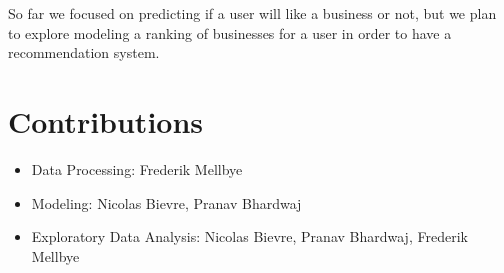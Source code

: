 \documentclass[letterpaper, 11pt]{article}
\begin{document}
So far we focused on predicting if a user will like a business or not, but we plan to explore modeling a ranking of businesses for a user in order to have a recommendation system.



\section{Contributions}

\begin{itemize}
    \item Data Processing: Frederik Mellbye
    \item Modeling: Nicolas Bievre, Pranav Bhardwaj
    \item Exploratory Data Analysis: Nicolas Bievre, Pranav Bhardwaj, Frederik Mellbye
\end{itemize}
\end{document}
